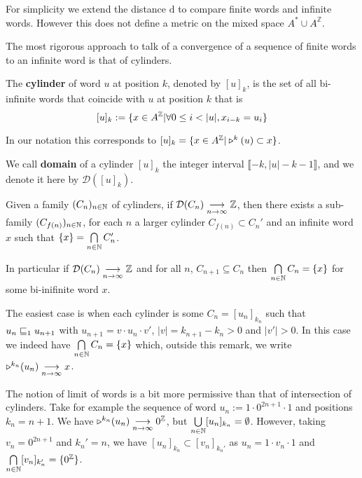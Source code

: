 \begin{remark}
  For simplicity we extend the distance $\mathrm{d}$ to compare finite words and infinite words.
  However this does not define a metric on the mixed space $A^*\cup A^\mathbb{Z}$.

  The most rigorous approach to talk of a convergence of a sequence of finite words to an infinite word is that of cylinders.

  The \textbf{cylinder} of word $u$ at position $k$, denoted by $[u]_k$, is the set of all bi-infinite words that coincide with $u$ at position $k$ that is
  \[ [u]_k := \{ x \in A^\ZZ | \forall 0\leq i <|u|, x_{i-k}=u_i\} \]

  In our notation this corresponds to $[u]_k = \{ x \in A^\ZZ | \shift{k}{}(u) \subset x\}$.

  We call \textbf{domain} of a cylinder $[u]_k$ the integer interval $\llbracket -k, |u|-k-1\rrbracket$, and we denote it here by $\mathcal{D}([u]_k)$.

  Given a family $(C_n)_{n\in{\mathbb{N}}}$ of cylinders, if $\mathcal{D}(C_n)\underset{n\to\infty}{\longrightarrow} {\mathbb{Z}}$, then there exists a sub-family $(C_{f(n)})_{n \in {\mathbb{N}}}$, for each $n$ a larger cylinder $C_{f(n)} \subset C_n'$ and an infinite word $x$ such that $\{x\} = \bigcap\limits_{n\in{\mathbb{N}}} C_n'$.

  In particular if $\mathcal{D}(C_n)\underset{n\to\infty}{\longrightarrow} {\mathbb{Z}}$ and for all $n$, $C_{n+1}\subseteq C_n$ then $\bigcap\limits_{n\in{\mathbb{N}}} C_{n}=\{x\}$ for some bi-inifinite word $x$.

  The easiest case is when each cylinder is some $C_n=[u_n]_{k_n}$ such that $u_n \sqsubseteq_{1} u_{n+1}$ with $u_{n+1}= v\cdot u_n \cdot v'$, $|v|=k_{n+1}-k_{n}>0$ and $|v'|>0$.
  In this case we indeed have $\bigcap\limits_{n\in{\mathbb{N}}} C_{n}=\{x\}$ which, outside this remark, we write $\shift{k_n}{}(u_n) \underset{n\to\infty}{\longrightarrow} x$.
\end{remark}

\begin{remark}
  The notion of limit of words is a bit more permissive than that of intersection of cylinders.
  Take for example the sequence of word $u_n := 1\cdot 0^{2n+1}\cdot 1$ and positions $k_n=n+1$.
  We have $\shift{k_n}{}(u_n) \underset{n \to \infty}{\longrightarrow} 0^\ZZ$, but $\bigcup\limits_{n\in{\mathbb{N}}}[u_n]_{k_n} = \emptyset$.
  However, taking $v_n = 0^{2n+1}$ and $k_n'=n$, we have $[u_n]_{k_n} \subset [v_n]_{k_n'}$ as $u_n = 1\cdot v_n \cdot 1$ and $\bigcap\limits_{n\in {\mathbb{N}}}[v_n]_{k_n'} = \{ 0^{\mathbb{Z}}\}$.
\end{remark}


